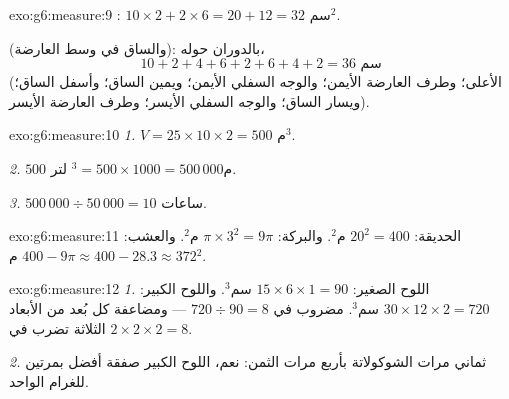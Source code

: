 \begin{solution}{exo:g6:measure:9}
: $10 \times 2 + 2 \times 6 = 20 + 12 = 32$ سم$^2$.

 (والساق في وسط العارضة): بالدوران حوله،
\[
10 + 2 + 4 + 6 + 2 + 6 + 4 + 2 = 36 \text{ سم}
\]
(الأعلى؛ وطرف العارضة الأيمن؛ والوجه السفلي الأيمن؛ ويمين الساق؛ وأسفل
الساق؛ ويسار الساق؛ والوجه السفلي الأيسر؛ وطرف العارضة الأيسر).
\end{solution}

\begin{solution}{exo:g6:measure:10}
\emph{1.} $V = 25 \times 10 \times 2 = 500$ م$^3$.

\emph{2.} $500$ م$^3 = 500 \times 1000 = 500\,000$ لتر.

\emph{3.} $500\,000 \div 50\,000 = 10$ ساعات.
\end{solution}

\begin{solution}{exo:g6:measure:11}
الحديقة: $20^2 = 400$ م$^2$. والبركة: $\pi \times 3^2 = 9\pi$ م$^2$.
والعشب: $400 - 9\pi \approx 400 - 28.3 \approx 372$ م$^2$.
\end{solution}

\begin{solution}{exo:g6:measure:12}
\emph{1.} اللوح الصغير: $15 \times 6 \times 1 = 90$ سم$^3$. واللوح الكبير:
$30 \times 12 \times 2 = 720$ سم$^3$.  مضروب في
$720 \div 90 = 8$ --- ومضاعفة كل بُعد من الأبعاد الثلاثة تضرب
 في $2 \times 2 \times 2 = 8$.

\emph{2.} ثماني مرات الشوكولاتة بأربع مرات الثمن: نعم،
اللوح الكبير صفقة أفضل بمرتين للغرام الواحد.
\end{solution}

